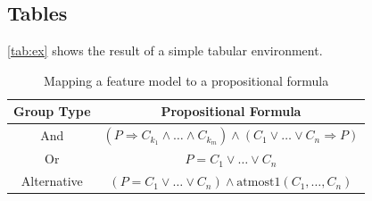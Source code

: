 \subsection*{Tables}

\autoref{tab:ex} shows the result of a simple tabular environment.

\begin{table}[htbp]
        \caption{Mapping a feature model to a propositional formula} 
	\centering
		\begin{tabular}{cc}\toprule
			Group Type & Propositional Formula\\\midrule
			And & $(P \Rightarrow C_{k_1} \wedge\ldots\wedge C_{k_m}) \land (C_1\vee\ldots\vee C_n \Rightarrow P)$\\\addlinespace
			Or & $P = C_1\vee\ldots\vee C_n$\\
			Alternative & $(P = C_1\vee\ldots\vee C_n) \land \mbox{atmost}1(C_1,\ldots,C_n)$\\
			\bottomrule
		\end{tabular}
	\label{tab:ex}
\end{table}

